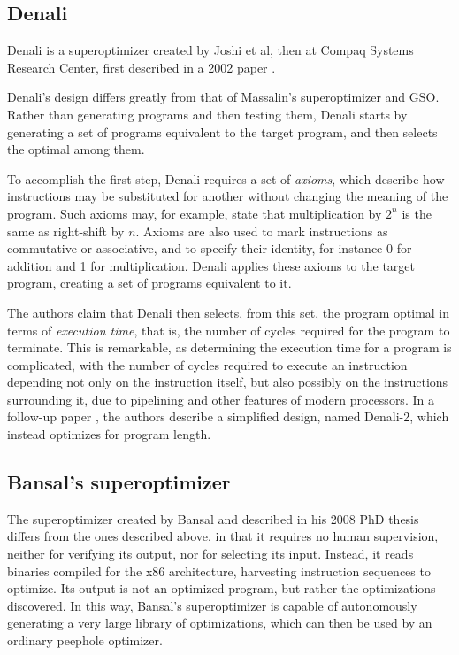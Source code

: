 \documentclass[a4paper,11pt]{kth-mag}
\begin{document}
\subsection{Denali}

Denali is a superoptimizer created by Joshi et al, then at Compaq Systems Research Center, first described in a 2002 paper \cite{joshi02}.

Denali's design differs greatly from that of Massalin's superoptimizer and GSO.
Rather than generating programs and then testing them, Denali starts by generating a set of programs equivalent to the target program, and then selects the optimal among them.

To accomplish the first step, Denali requires a set of \emph{axioms}, which describe how instructions may be substituted for another without changing the meaning of the program.
Such axioms may, for example, state that multiplication by $2^n$ is the same as right-shift by $n$.
Axioms are also used to mark instructions as commutative or associative, and to specify their identity, for instance 0 for addition and 1 for multiplication.
Denali applies these axioms to the target program, creating a set of programs equivalent to it.

The authors claim that Denali then selects, from this set, the program optimal in terms of \emph{execution time}, that is, the number of cycles required for the program to terminate.
This is remarkable, as determining the execution time for a program is complicated, with the number of cycles required to execute an instruction depending not only on the instruction itself, but also possibly on the instructions surrounding it, due to pipelining and other features of modern processors.
In a follow-up paper \cite{joshi06}, the authors describe a simplified design, named Denali-2, which instead optimizes for program length.


\subsection{Bansal's superoptimizer}

The superoptimizer created by Bansal and described in his 2008 PhD thesis \cite{bansal_thesis} differs from the ones described above, in that it requires no human supervision, neither for verifying its output, nor for selecting its input.
Instead, it reads binaries compiled for the x86 architecture, harvesting instruction sequences to optimize.
Its output is not an optimized program, but rather the optimizations discovered.
In this way, Bansal's superoptimizer is capable of autonomously generating a very large library of optimizations, which can then be used by an ordinary peephole optimizer.
\end{document}
